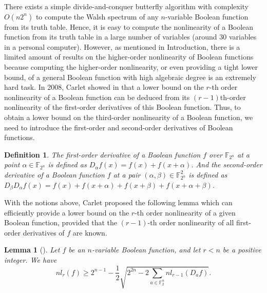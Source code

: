 \documentclass{article}
\newcommand{\F}{\mathbb{F}}
\newcommand{\0}{\textbf{0}}
\newcommand{\1}{\textbf{1}}
\theoremstyle{plain}
\newtheorem{lemma}{Lemma}
\newtheorem{definition}{Definition}
\begin{document}
    There exists a simple divide-and-conquer butterfly algorithm with complexity $O(n2^n)$ to compute the Walsh spectrum of any $n$-variable Boolean function from its truth table.
    Hence, it is easy to compute the nonlinearity of a Boolean function from its truth table in a large number of variables (around $30$ variables in a personal computer).
    However, as mentioned in Introduction, there is a limited amount of results on the higher-order nonlinearity of Boolean functions
    because computing the higher-order nonlinearity, or even providing a tight lower bound, of a general Boolean function with high algebraic degree is an extremely hard task.
    In 2008, Carlet showed in \cite{Carlet2008lowbound_NL_profile} that a lower bound on the $r$-th order nonlinearity of a Boolean function can be deduced from its $(r-1)$th-order nonlinearity of the first-order derivatives of this Boolean function.
    Thus, to obtain a lower bound on the third-order nonlinearity of a Boolean function, we need to introduce the first-order and second-order derivatives of Boolean functions.
    \begin{definition}
        The first-order derivative of a Boolean function $f$ over $\F_{2^n}$ at a point $\alpha\in\F_{2^n}$ is defined as $D_{\alpha}f(x)=f(x)+f(x+\alpha)$.
        And the second-order derivative of a Boolean function $f$ at a pair $(\alpha,\beta)\in\F_{2^n}^2$ is defined as $D_{\beta}D_{\alpha}f(x)=f(x)+f(x+\alpha)+f(x+\beta)+f(x+\alpha+\beta)$.
    \end{definition}
    With the notions above, Carlet proposed the following lemma which can efficiently provide a lower bound on the $r$-th order nonlinearity of a given Boolean function,
    provided that the $(r-1)$-th order nonlinearity of all first-order derivatives of $f$ are known.
    \begin{lemma}[\cite{Carlet2008lowbound_NL_profile}]\label{thm:High_order_nl_bound1}
        Let $f$ be an $n$-variable Boolean function, and let $r<n$ be a positive integer.
        We have
        \[nl_r(f)\ge 2^{n-1}-\frac{1}{2}\sqrt{2^{2n}-2\sum_{a\in\F_2^n}nl_{r-1}(D_af)}.\]
    \end{lemma}
\end{document}
